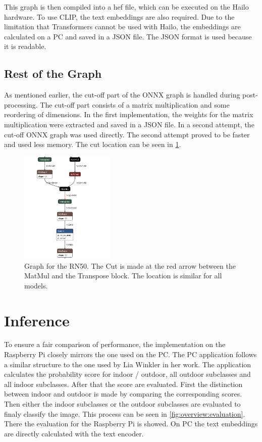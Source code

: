 This graph is then compiled into a \acrshort{hef} file, which can be executed on the Hailo hardware.
To use CLIP, the text embeddings are also required.
Due to the limitation that Transformers cannot be used with Hailo, the embeddings are calculated on a PC and saved in a JSON file.
The JSON format is used because it is readable.

\subsection{Rest of the Graph}

As mentioned earlier, the cut-off part of the ONNX graph is handled during post-processing. 
The cut-off part consists of a matrix multiplication and some reordering of dimensions. 
In the first implementation, the weights for the matrix multiplication were extracted and saved in a JSON file.
In a second attempt, the cut-off ONNX graph was used directly.
The second attempt proved to be faster and used less memory.
The cut location can be seen in \cref{fig:implementation:RNcut}.

\begin{figure}
    \centering
    \includegraphics[width=0.4\textwidth]{Images/Implementation/firstcutlocation.png}
    \caption{Graph for the RN50. The Cut is made at the red arrow between the MatMul and the Transpose block.
    The location is similar for all models.}
    \label{fig:implementation:RNcut}
\end{figure}
\section{Inference}

To ensure a fair comparison of performance, the implementation on the Raspberry Pi closely mirrors the one used on the PC. 
The PC application follows a similar structure to the one used by Lia Winkler in her work.
The application calculates the probability score for indoor / outdoor, all outdoor subclasses and all indoor subclasses.
After that the score are evaluated.
First the distinction between indoor and outdoor is made by comparing the corresponding scores.
Then either the indoor subclasses or the outdoor subclasses are evaluated to finaly classify the image.
This process can be seen in \cref{fig:overview:evaluation}.
There the evaluation for the Raspberry Pi is showed.
On PC the text embeddings are directly calculated with the text encoder.

